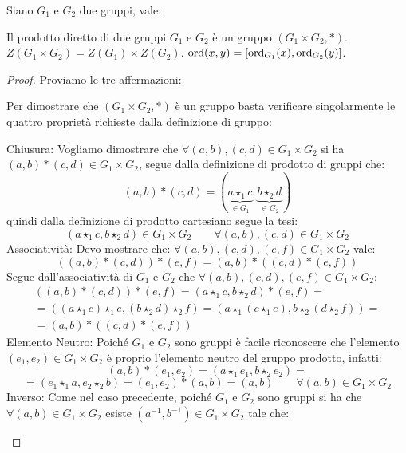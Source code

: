 \documentclass[11pt]{scrartcl}
\begin{document}
\begin{theorem}
\label{g:ProdottoDiretto}
Siano $G_1$ e $G_2$ due gruppi, vale: 
	\begin{enumerate}[(1)]
	\ii Il prodotto diretto di due gruppi $G_1$ e $G_2$ è un gruppo $(G_1 \times G_2, \ast)$.
	\ii $Z(G_1 \times G_2)=Z(G_1) \times Z(G_2)$.
	\ii $\operatorname{ord}(x,y)=[\operatorname{ord}_{G_1}(x),\operatorname{ord}_{G_2}(y)]$.
	\end{enumerate}
\end{theorem}

\begin{proof}
Proviamo le tre affermazioni:
	\begin{enumerate}[(1)]
	\ii Per dimostrare che $(G_1 \times G_2, \ast)$ è un gruppo basta verificare singolarmente le quattro proprietà richieste dalla definizione di gruppo:
		\begin{enumerate}[(a)]
		\ii Chiusura: Vogliamo dimostrare che $\forall (a,b),(c,d) \in G_1 \times G_2$ si ha $(a,b) \ast (c,d)\in  G_1 \times G_2$, segue dalla definizione di prodotto di gruppi che:
			\[ (a,b) \ast (c,d)
			=
			(\underbrace{a \star_1 c}_{\in G_1}, \underbrace{b \star_2 d}_{\in G_2})
			\] 
			quindi dalla definizione di prodotto cartesiano segue la tesi:
			\[ (a \star_1 c, b \star_2 d)
			\in
			G_1 \times G_2
			\qquad
			\forall (a,b),(c,d) \in G_1 \times G_2
			\]
		\ii Associatività: Devo mostrare che: $\forall (a,b),(c,d),(e,f) \in G_1 \times G_2$ vale:
			\[ ((a,b)\ast(c,d))\ast(e,f) =  (a,b)\ast((c,d)\ast(e,f))\]
			Segue dall'associatività di $G_1$ e $G_2$ che  $\forall (a,b),(c,d),(e,f) \in G_1 \times G_2$:
			\begin{multline*}
			((a,b)\ast(c,d))\ast(e,f)
			=
			(a \star_1 c, b \star_2 d)\ast(e,f)
			= \\
			=
			((a \star_1 c) \star_1 e, (b \star_2 d) \star_2 f)
			= 
			(a \star_1 (c \star_1 e), b \star_2 (d \star_2 f))
			= \\
			=
			(a,b)\ast((c,d)\ast(e,f))
			\end{multline*}
		\ii Elemento Neutro: Poiché $G_1$ e $G_2$ sono gruppi è facile riconoscere che l'elemento $(e_1,e_2) \in G_1 \times G_2$ è proprio l'elemento neutro del gruppo prodotto, infatti:
			\[ (a,b) \ast  (e_1,e_2)
			=
			(a \star_1 e_1, b \star_2 e_2)
			=
			\]\[
			=
			(e_1 \star_1 a, e_2 \star_2 b)
			=
			(e_1,e_2) \ast (a,b)
			=
			(a,b)
			\qquad
			\forall (a,b) \in G_1 \times G_2
			\]
		\ii Inverso: Come nel caso precedente, poiché $G_1$ e $G_2$ sono gruppi si ha che $\forall (a,b) \in G_1 \times G_2$ esiste $(a^{-1},b^{-1}) \in G_1 \times G_2$ tale che:

\end{enumerate}
\end{enumerate}
\end{proof}
\end{document}

